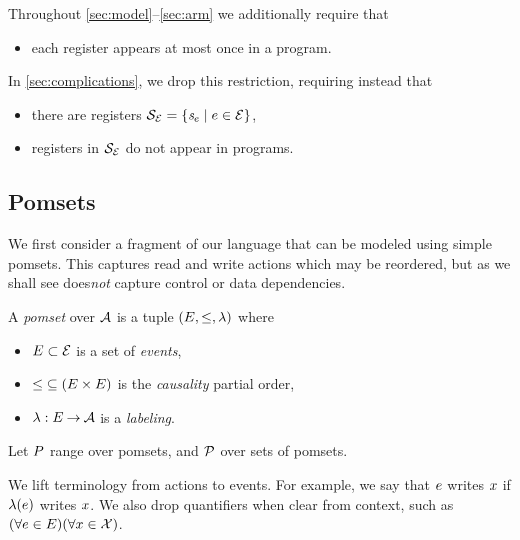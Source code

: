 Throughout \textsection\ref{sec:model}--\ref{sec:arm} we 
additionally require that
\begin{itemize}
\item each register appears at most once in a program.
\end{itemize}
In \textsection\ref{sec:complications}, we drop this restriction, requiring
instead that
\begin{itemize}
\item there are registers
  $\mathcal{S}_{\mathcal{E}}=\{\mathit{s}_{e}\mid e\in\mathcal{E}\}$,
\item registers in $\mathcal{S}_{\mathcal{E}}$ do not appear in programs.
\end{itemize}

\subsection{Pomsets}

We first consider a fragment of our language that can be modeled using simple
pomsets.  This captures read and write actions which may be reordered,
but as we shall see does\emph{not} capture control or data dependencies.

\begin{definition}
  \label{def:pomsets}
  A \emph{pomset} over $\mathcal{A}$ is a tuple
  $(E, {\le}, \lambda)$ where
  \begin{itemize}
  \item $E\subset\mathcal{E}$ is a set of \emph{events},
  \item
    ${\le} \subseteq (E\times E)$ is the \emph{causality} partial order, 
  \item
    $\lambda: E \mathbin\rightarrow \mathcal{A}$ is a \emph{labeling}.
  \end{itemize}
\end{definition}
Let $P$ range over pomsets, and $\mathcal{P}$ over sets of pomsets.

We lift terminology from actions to events.  For example, we say that $e$
writes $x$ if $\lambda(e)$ writes $x$.  We also drop quantifiers
when clear from context, such as
$(\forall e\in E)(\forall x\in\mathcal{X})$.

